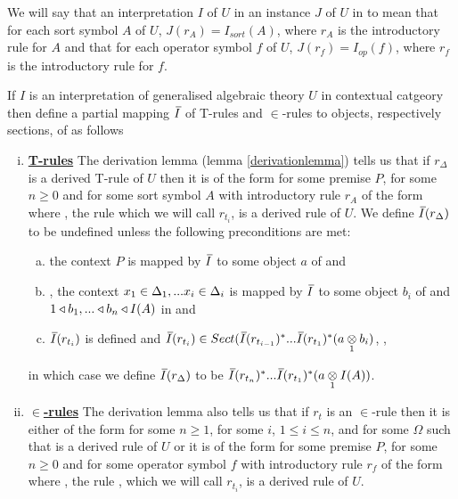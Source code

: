 We will say that  an interpretation $I$ of $U$ in \catcw {} an  instance $J$ of $U$ in \catcw to mean that for each sort symbol $A$ of $U$,
$J(r_A) = I_{sort}(A)$, where $r_A$ is the introductory rule for $A$ and that for each operator symbol
$f$ of $U$,   $J(r_f) = I_{op}(f)$, where $r_f$ is the introductory rule for $f$.

\newcommand{\Ibar}{\mkern 2.5mu\overline{\mkern-2.5mu I\mkern1.5mu}\mkern -1.5mu}

\newpage
\begin{definition} [\highlight{Definition of \large $\Ibar$}]
If $I$ is an interpretation of generalised algebraic theory $U$ in contextual catgeory \catcw
then define a
partial mapping $\Ibar$  of T-rules and $\in$-rules to objects, respectively sections, of \catcw
as follows
\begin{enumerate}[(i)] 
\item \underline{\textbf{T-rules}} 
The derivation lemma (lemma \ref{derivationlemma}) tells us that if $r_\Delta$ is a derived T-rule of $U$  then it is of the form  for some premise $P$, for some $n \geq 0$ and for some sort symbol $A$ with introductory rule $r_A$ of the form  where \foreachi, the rule 
 which we will call $r_{t_i}$, is a derived rule of $U$. 
We define $\Ibar(r_\Delta)$ to be undefined unless the following preconditions are met:
\begin{enumerate}[(a)]
\item
the context  $P$ is mapped by $\Ibar$ to some object $a$ of \catcw and 
\item
\foreachi, the context $x_1 \in \Delta_1,... x_{i} \in \Delta_{i}$ is mapped by $\Ibar$ to some object $b_i$ of \catcw
and $1 \triangleleft b_1,...\triangleleft b_n \triangleleft I(A)$ in \catcw and
\item
$\Ibar(r_{t_i})$ is defined and $\Ibar(r_{t_i}) \in Sect(\Ibar(r_{t_{i-1}})^*...\Ibar(r_{t_1})^*(\crossx{a}{b_i}{1})$, \foreachi,
\end{enumerate}
in which case we define $\Ibar(r_\Delta)$ to be $\Ibar(r_{t_n})^*...\Ibar(r_{t_1})^*(\crossx{a}{I(A)}{1})$. 
\item \underline{\textbf{$\boldsymbol {\in}$-rules}} 
The derivation lemma also tells us that if $r_t$ is an $\in$-rule then it is  
either  of the form  for some $n \ge 1$, for some $i$, $1 \leq i \leq n$, 
and for some $\Omega$ such that  is a derived rule of $U$
or  it is of the form  for some premise $P$, for some $n \geq 0$ and for some operator symbol $f$ with introductory rule $r_f$ of the form  where \foreachi, the rule 
, which we will call $r_{t_i}$, is a derived rule of $U$. 


\end{enumerate}
\end{definition}
